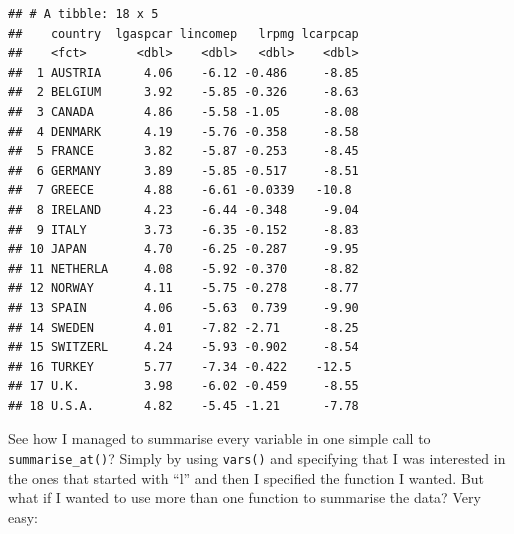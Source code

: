 \documentclass[]{gitbook}
\newenvironment{Shaded}{\begin{snugshade}}{\end{snugshade}}
\newcommand{\KeywordTok}[1]{\textcolor[rgb]{0.13,0.29,0.53}{\textbf{#1}}}
\newcommand{\NormalTok}[1]{#1}
\newcommand{\OperatorTok}[1]{\textcolor[rgb]{0.81,0.36,0.00}{\textbf{#1}}}
\newcommand{\StringTok}[1]{\textcolor[rgb]{0.31,0.60,0.02}{#1}}
\begin{document}
\begin{verbatim}
## # A tibble: 18 x 5
##    country  lgaspcar lincomep   lrpmg lcarpcap
##    <fct>       <dbl>    <dbl>   <dbl>    <dbl>
##  1 AUSTRIA      4.06    -6.12 -0.486     -8.85
##  2 BELGIUM      3.92    -5.85 -0.326     -8.63
##  3 CANADA       4.86    -5.58 -1.05      -8.08
##  4 DENMARK      4.19    -5.76 -0.358     -8.58
##  5 FRANCE       3.82    -5.87 -0.253     -8.45
##  6 GERMANY      3.89    -5.85 -0.517     -8.51
##  7 GREECE       4.88    -6.61 -0.0339   -10.8 
##  8 IRELAND      4.23    -6.44 -0.348     -9.04
##  9 ITALY        3.73    -6.35 -0.152     -8.83
## 10 JAPAN        4.70    -6.25 -0.287     -9.95
## 11 NETHERLA     4.08    -5.92 -0.370     -8.82
## 12 NORWAY       4.11    -5.75 -0.278     -8.77
## 13 SPAIN        4.06    -5.63  0.739     -9.90
## 14 SWEDEN       4.01    -7.82 -2.71      -8.25
## 15 SWITZERL     4.24    -5.93 -0.902     -8.54
## 16 TURKEY       5.77    -7.34 -0.422    -12.5 
## 17 U.K.         3.98    -6.02 -0.459     -8.55
## 18 U.S.A.       4.82    -5.45 -1.21      -7.78
\end{verbatim}

See how I managed to summarise every variable in one simple call to \texttt{summarise\_at()}? Simply by
using \texttt{vars()} and specifying that I was interested in the ones that started with ``l'' and then I
specified the function I wanted. But what if I wanted to use more than one function to summarise
the data? Very easy:

\begin{Shaded}
\end{Shaded}
\end{document}

